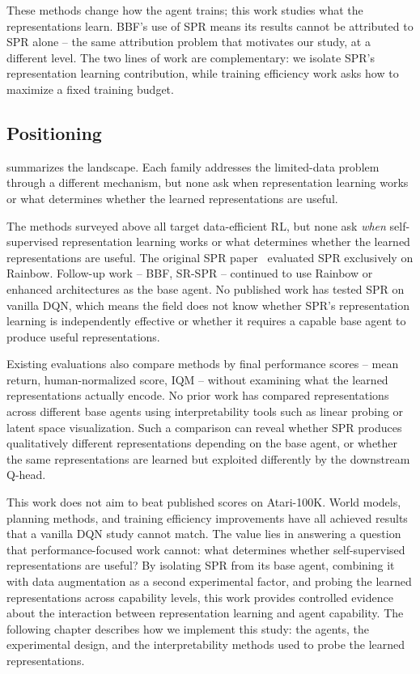 \smallskip
These methods change how the agent trains; this work studies what
the representations learn. BBF's use of SPR means its results
cannot be attributed to SPR alone -- the same attribution problem
that motivates our study, at a different level. The two lines of
work are complementary: we isolate SPR's representation learning
contribution, while training efficiency work asks how to maximize
a fixed training budget.

\subsection{Positioning}
\label{subsec:positioning}

 summarizes the landscape. Each family
addresses the limited-data problem through a different mechanism,
but none ask when representation learning works or what determines
whether the learned representations are useful.



\smallskip
The methods surveyed above all target data-efficient RL, but none
ask \emph{when} self-supervised representation learning works or
what determines whether the learned representations are useful. The
original SPR paper~\citep{schwarzer2021dataefficient} evaluated SPR
exclusively on Rainbow. Follow-up work -- BBF, SR-SPR -- continued
to use Rainbow or enhanced architectures as the base agent. No
published work has tested SPR on vanilla DQN, which means the field
does not know whether SPR's representation learning is
independently effective or whether it requires a capable base agent
to produce useful representations.

\smallskip
Existing evaluations also compare methods by final performance
scores -- mean return, human-normalized score, IQM -- without
examining what the learned representations actually encode. No
prior work has compared representations across different base
agents using interpretability tools such as linear probing or
latent space visualization. Such a comparison can reveal whether
SPR produces qualitatively different representations depending on
the base agent, or whether the same representations are learned
but exploited differently by the downstream Q-head.

\smallskip
This work does not aim to beat published scores on Atari-100K.
World models, planning methods, and training efficiency
improvements have all achieved results that a vanilla DQN study
cannot match. The value lies in answering a question that
performance-focused work cannot: what determines whether
self-supervised representations are useful? By isolating SPR from
its base agent, combining it with data augmentation as a second
experimental factor, and probing the learned representations across
capability levels, this work provides controlled evidence about the
interaction between representation learning and agent capability.
The following chapter describes how we implement this study: the
agents, the experimental design, and the interpretability methods
used to probe the learned representations.
